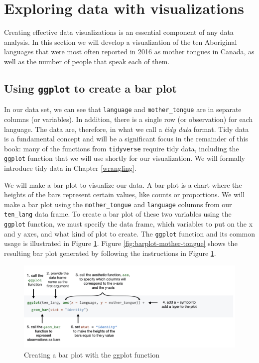 \documentclass[
]{book}
\begin{document}
\hypertarget{exploring-data-with-visualizations}{%
\section{Exploring data with visualizations}\label{exploring-data-with-visualizations}}

Creating effective data visualizations  is an essential component of any data
analysis. In this section we will develop a visualization of the
ten Aboriginal languages that were most often reported in 2016 as mother tongues in
Canada, as well as the number of people that speak each of them.

\hypertarget{using-ggplot-to-create-a-bar-plot}{%
\subsection{\texorpdfstring{Using \texttt{ggplot} to create a bar plot}{Using ggplot to create a bar plot}}\label{using-ggplot-to-create-a-bar-plot}}

In our data set, we can see that \texttt{language} and \texttt{mother\_tongue} are in separate
columns (or variables). In addition, there is a single row (or observation) for each language.
The data are, therefore, in what we call a \emph{tidy data} format. Tidy data is a
fundamental concept and will be a significant focus in the remainder of this
book: many of the functions from \texttt{tidyverse} require tidy data, including the
\texttt{ggplot}  function that we will use shortly for our visualization. We will
formally introduce tidy data in Chapter \ref{wrangling}.

We will make a bar plot to visualize our data. A bar plot  is a chart where the
heights of the bars represent certain values, like counts or proportions. We
will make a bar plot using the \texttt{mother\_tongue} and \texttt{language} columns from our
\texttt{ten\_lang} data frame. To create a bar plot of these two variables using the
\texttt{ggplot} function, we must specify the data frame, which variables
to put on the x and y axes, and what kind of plot to create. The \texttt{ggplot}
function and its common usage is illustrated in Figure \ref{fig:img-ggplot}.
Figure \ref{fig:barplot-mother-tongue} shows the resulting bar plot
generated by following the instructions in Figure \ref{fig:img-ggplot}.

\begin{figure}
\includegraphics[width=1100pt]{img/ggplot_function} \caption{Creating a bar plot with the ggplot function}\label{fig:img-ggplot}
\end{figure}
\end{document}
